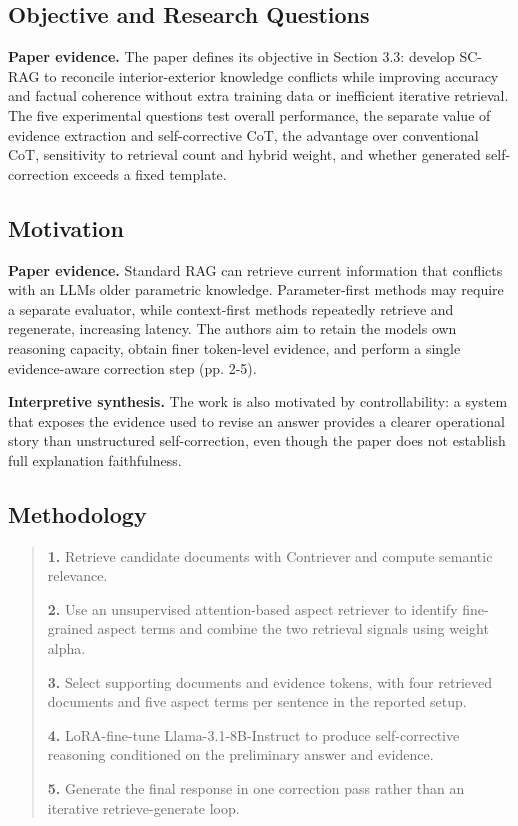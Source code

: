 \documentclass[11pt]{article}
\begin{document}
\subsection{Objective and Research
Questions}\label{objective-and-research-questions}

\textbf{Paper evidence.} The paper defines its objective in Section 3.3: develop SC-RAG
to reconcile interior-exterior knowledge conflicts while improving
accuracy and factual coherence without extra training data or
inefficient iterative retrieval. The five experimental questions test
overall performance, the separate value of evidence extraction and
self-corrective CoT, the advantage over conventional CoT, sensitivity to
retrieval count and hybrid weight, and whether generated self-correction
exceeds a fixed template.

\subsection{Motivation}\label{motivation}

\textbf{Paper evidence.} Standard RAG can retrieve current information that conflicts
with an LLM\textquotesingle s older parametric knowledge.
Parameter-first methods may require a separate evaluator, while
context-first methods repeatedly retrieve and regenerate, increasing
latency. The authors aim to retain the model\textquotesingle s own
reasoning capacity, obtain finer token-level evidence, and perform a
single evidence-aware correction step (pp. 2-5).

\textbf{Interpretive synthesis.} The work is also motivated by controllability: a system
that exposes the evidence used to revise an answer provides a clearer
operational story than unstructured self-correction, even though the
paper does not establish full explanation faithfulness.

\subsection{Methodology}\label{methodology}

\begin{quote}
\textbf{1.} Retrieve candidate documents with Contriever and compute
semantic relevance.

\textbf{2.} Use an unsupervised attention-based aspect retriever to
identify fine-grained aspect terms and combine the two retrieval signals
using weight alpha.

\textbf{3.} Select supporting documents and evidence tokens, with four
retrieved documents and five aspect terms per sentence in the reported
setup.

\textbf{4.} LoRA-fine-tune Llama-3.1-8B-Instruct to produce
self-corrective reasoning conditioned on the preliminary answer and
evidence.

\textbf{5.} Generate the final response in one correction pass rather
than an iterative retrieve-generate loop.
\end{quote}
\end{document}
